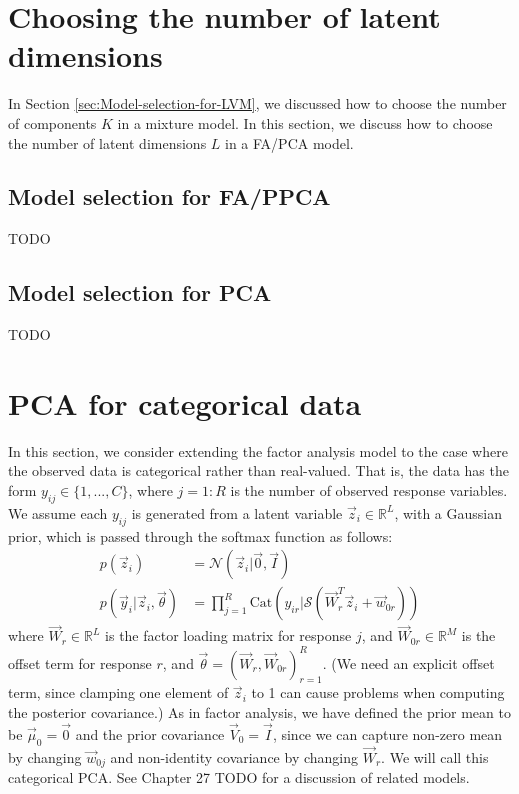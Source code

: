 \section{Choosing the number of latent dimensions}
\label{sec:FA-Choosing-L}
In Section \ref{sec:Model-selection-for-LVM}, we discussed how to choose the number of components $K$ in a mixture model. In this section, we discuss how to choose the number of latent dimensions $L$ in a FA/PCA model.


\subsection{Model selection for FA/PPCA}
TODO

\subsection{Model selection for PCA}
TODO



\section{PCA for categorical data}
In this section, we consider extending the factor analysis model to the case where the observed data is categorical rather than real-valued. That is, the data has the form $y_{ij} \in \{1,...,C\}$, where $j=1:R$ is the number of observed response variables. We assume each $y_{ij}$ is generated from a latent variable $\vec{z}_i \in \mathbb{R}^L$, with a Gaussian prior, which is passed through the softmax function as follows:
\begin{align}
p(\vec{z}_i) & = \mathcal{N}(\vec{z}_i|\vec{0},\vec{I}) \\
p(\vec{y}_i|\vec{z}_i,\vec{\theta}) & = \prod\limits_{j=1}^R \mathrm{Cat}(y_{ir}|\mathcal{S}(\vec{W}_r^T\vec{z}_i+\vec{w}_{0r}))
\end{align}
where $\vec{W}_r \in \mathbb{R}^L$ is the factor loading matrix for response $j$, and $\vec{W}_{0r} \in \mathbb{R}^M$ is the offset term for response $r$, and $\vec{\theta}=(\vec{W}_r,\vec{W}_{0r})_{r=1}^R$. (We need an explicit offset term, since clamping one element of $\vec{z}_i$ to 1 can cause problems when computing the posterior covariance.) As in factor analysis, we have defined the prior mean to be $\vec{\mu}_0=\vec{0}$ and the prior covariance $\vec{V}_0=\vec{I}$, since we can capture non-zero mean by changing $\vec{w}_{0j}$ and non-identity covariance by changing $\vec{W}_r$. We will call this categorical PCA. See Chapter 27 TODO for a discussion of related models.

